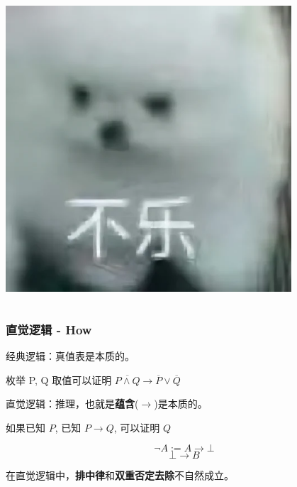 \documentclass[UTF-8]{ctexbeamer}
\begin{document}
\begin{frame}
\begin{columns}
\begin{column}{0.5\textwidth}
      \includegraphics[width=0.8\textwidth]{assets/bule.png}
    \end{column}
  \end{columns}
\end{frame}

\begin{frame}
  \frametitle{直觉逻辑 - How}

  经典逻辑：真值表是本质的。

  \begin{center}
  枚举 P, Q 取值可以证明 $ \overline{P \land Q} \rightarrow \overline{P} \lor \overline{Q} $
  \end{center}

  \pause

  直觉逻辑：推理，也就是\textbf{蕴含}($\rightarrow$)是本质的。

  \begin{center}
    如果已知 $P$, 已知 $P \rightarrow Q$, 可以证明 $Q$
  \end{center}

  \pause

  \vspace{1em}

  $$
  \neg A := A \rightarrow \bot
  $$
  $$
  \bot \rightarrow B
  $$

  \pause

  \vspace{1em}

  \begin{center}
    在直觉逻辑中，\textbf{排中律}和\textbf{双重否定去除}不自然成立。
  \end{center}
\end{frame}
\end{document}
